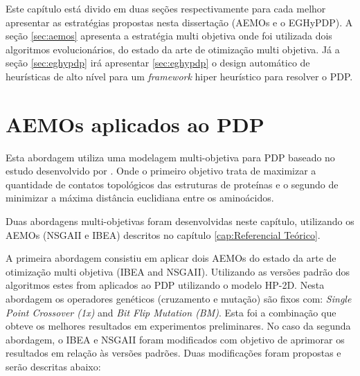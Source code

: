  Este capítulo está divido em duas seções respectivamente para cada melhor apresentar as estratégias propostas nesta dissertação (AEMOs e o EGHyPDP). A seção \ref{sec:aemos} apresenta a estratégia multi objetiva onde foi utilizada dois algoritmos evolucionários, do estado da arte de otimização multi objetiva. Já a seção  \ref{sec:eghypdp} irá apresentar \ref{sec:eghypdp} o design automático de heurísticas de alto nível para um \textit{framework} hiper heurístico para resolver o PDP.
 


\section{AEMOs aplicados ao PDP}
\label{sec:aeoms}

Esta abordagem utiliza uma modelagem multi-objetiva para PDP baseado no estudo desenvolvido por \cite{gabriel2012algoritmos}. Onde o primeiro objetivo trata de maximizar a quantidade de contatos topológicos das estruturas de proteínas e o segundo de minimizar a máxima distância euclidiana entre os aminoácidos. 

Duas abordagens multi-objetivas foram desenvolvidas neste capítulo, utilizando os AEMOs (NSGAII e IBEA) descritos no capítulo \ref{cap:Referencial Teórico}.

A primeira abordagem consistiu em aplicar dois AEMOs do estado da arte de otimização multi objetiva (IBEA and NSGAII). Utilizando as versões padrão dos algoritmos estes from aplicados ao PDP utilizando o modelo HP-2D. Nesta abordagem os operadores genéticos (cruzamento e mutação) são fixos com: \textit{Single Point Crossover (1x)} and \textit{Bit Flip Mutation (BM)}. Esta foi a combinação que obteve os melhores resultados em experimentos preliminares. No caso da segunda abordagem, o IBEA e NSGAII foram modificados com objetivo de aprimorar os resultados em relação às versões padrões. Duas modificações foram propostas e serão descritas abaixo:


